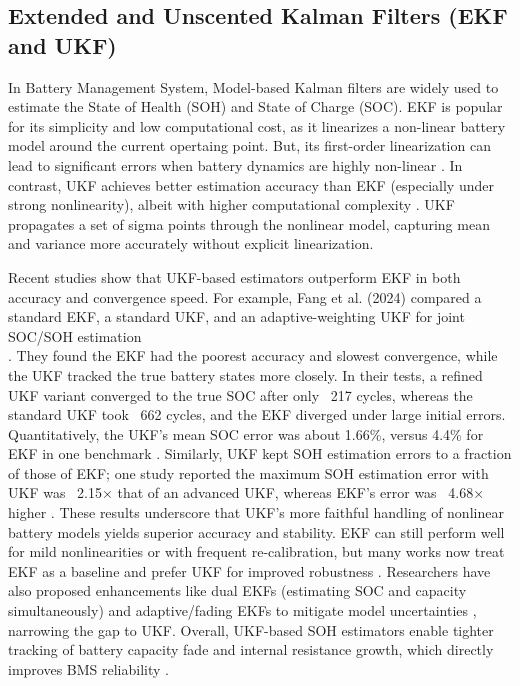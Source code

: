 \subsection{Extended and Unscented Kalman Filters (EKF and UKF)}
In Battery Management System, Model-based Kalman filters are widely used to estimate the State of Health (SOH) and State of Charge (SOC). EKF is popular for its simplicity and low computational cost, as it linearizes a non-linear battery model around the current opertaing point. But, its first-order linearization can lead to significant errors when battery dynamics are highly non-linear \cite{GUO2024113850}. In contrast, UKF achieves better estimation accuracy than EKF (especially under strong nonlinearity), albeit with higher computational complexity \cite{GUO2024113850}. UKF propagates a set of sigma points through the nonlinear model, capturing mean and variance more accurately without explicit linearization.

Recent studies show that UKF-based estimators outperform EKF in both accuracy and convergence speed. For example, Fang et al. (2024) compared a standard EKF, a standard UKF, and an adaptive-weighting UKF for joint SOC/SOH estimation \\ \cite{en17092145}. They found the EKF had the poorest accuracy and slowest convergence, while the UKF tracked the true battery states more closely. In their tests, a refined UKF variant converged to the true SOC after only ~217 cycles, whereas the standard UKF took ~662 cycles, and the EKF diverged under large initial errors. Quantitatively, the UKF’s mean SOC error was about 1.66\%, versus 4.4\% for EKF in one benchmark \cite{en6105088}. Similarly, UKF kept SOH estimation errors to a fraction of those of EKF; one study reported the maximum SOH estimation error with UKF was ~2.15× that of an advanced UKF, whereas EKF’s error was ~4.68× higher \cite{en17092145}. These results underscore that UKF’s more faithful handling of nonlinear battery models yields superior accuracy and stability. EKF can still perform well for mild nonlinearities or with frequent re-calibration, but many works now treat EKF as a baseline and prefer UKF for improved robustness \cite{en17092145}. Researchers have also proposed enhancements like dual EKFs (estimating SOC and capacity simultaneously) and adaptive/fading EKFs to mitigate model uncertainties \cite{GUO2024113850}, narrowing the gap to UKF. Overall, UKF-based SOH estimators enable tighter tracking of battery capacity fade and internal resistance growth, which directly improves BMS reliability \cite{GUO2024113850}.

